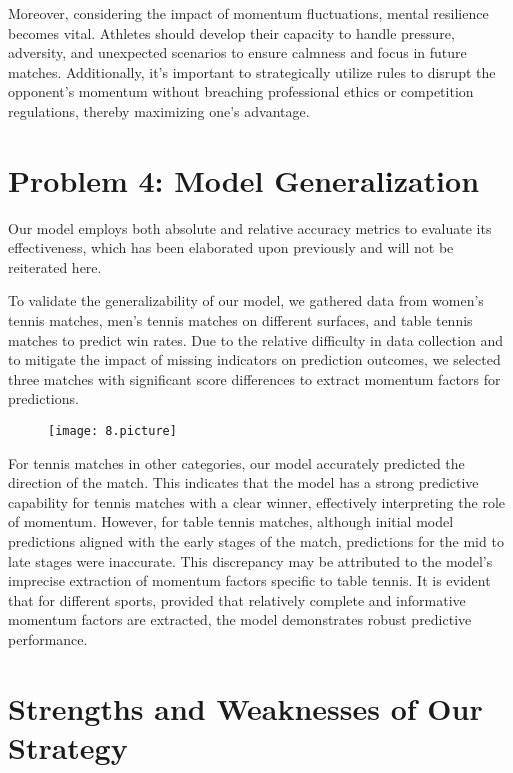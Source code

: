 \documentclass{mcmthesis}
\begin{document}
Moreover, considering the impact of momentum fluctuations, mental resilience becomes vital. Athletes should develop their capacity to handle pressure, adversity, and unexpected scenarios to ensure calmness and focus in future matches. Additionally, it's important to strategically utilize rules to disrupt the opponent's momentum without breaching professional ethics or competition regulations, thereby maximizing one's advantage.

\section{Problem 4: Model Generalization}

Our model employs both absolute and relative accuracy metrics to evaluate its effectiveness, which has been elaborated upon previously and will not be reiterated here.

To validate the generalizability of our model, we gathered data from women's tennis matches, men's tennis matches on different surfaces, and table tennis matches to predict win rates. Due to the relative difficulty in data collection and to mitigate the impact of missing indicators on prediction outcomes, we selected three matches with significant score differences to extract momentum factors for predictions.

\begin{figure}[ht]%
  \small
  \centering
  \texttt{[image: 8.picture]}
\end{figure}

For tennis matches in other categories, our model accurately predicted the direction of the match. This indicates that the model has a strong predictive capability for tennis matches with a clear winner, effectively interpreting the role of momentum. However, for table tennis matches, although initial model predictions aligned with the early stages of the match, predictions for the mid to late stages were inaccurate. This discrepancy may be attributed to the model's imprecise extraction of momentum factors specific to table tennis. It is evident that for different sports, provided that relatively complete and informative momentum factors are extracted, the model demonstrates robust predictive performance.

\section{Strengths and Weaknesses of Our Strategy}
\end{document}
